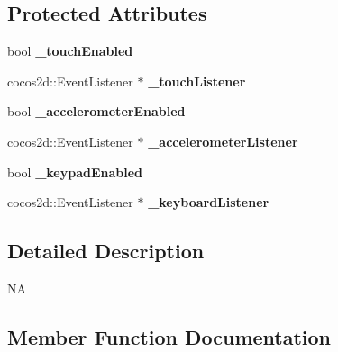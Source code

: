 \subsection*{Protected Attributes}
\begin{DoxyCompactItemize}
\item 
\mbox{\label{classcocostudio_1_1InputDelegate_a1613f3fedf16aa095570a090a82b3e28}} 
bool {\bfseries \+\_\+touch\+Enabled}
\item 
\mbox{\label{classcocostudio_1_1InputDelegate_adb2c400936188616b8d7640d94831a94}} 
cocos2d\+::\+Event\+Listener $\ast$ {\bfseries \+\_\+touch\+Listener}
\item 
\mbox{\label{classcocostudio_1_1InputDelegate_a0ec1b24dbc51801d626475f5e9a0edcc}} 
bool {\bfseries \+\_\+accelerometer\+Enabled}
\item 
\mbox{\label{classcocostudio_1_1InputDelegate_a5f626f578468843345604c79cdec9632}} 
cocos2d\+::\+Event\+Listener $\ast$ {\bfseries \+\_\+accelerometer\+Listener}
\item 
\mbox{\label{classcocostudio_1_1InputDelegate_ab12f19177e27f745276651f5eeb3578a}} 
bool {\bfseries \+\_\+keypad\+Enabled}
\item 
\mbox{\label{classcocostudio_1_1InputDelegate_aac77fb08d362588330937a948ab5685e}} 
cocos2d\+::\+Event\+Listener $\ast$ {\bfseries \+\_\+keyboard\+Listener}
\end{DoxyCompactItemize}


\subsection{Detailed Description}
NA 

\subsection{Member Function Documentation}
\mbox{\label{classcocostudio_1_1InputDelegate_a49ac0ed2dd298077ae8425b6254457c5}} 
